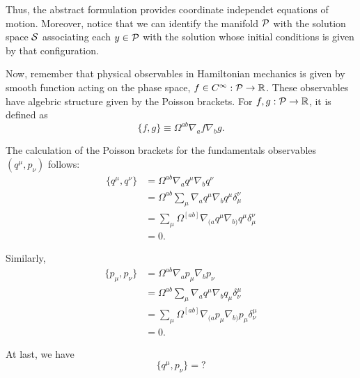 Thus, the abstract formulation provides coordinate independet equations of motion. Moreover, notice that we can identify the manifold \({\mathcal{P}}\) with the solution space \({\mathcal{S}}\) associating each \(y\in{\mathcal{P}}\) with the solution whose initial conditions is given by that configuration.

Now, remember that physical observables in Hamiltonian mechanics is given by smooth function acting on the phase space, \(f\in C^{\infty}:{\mathcal{P}}\to{\mathbb{R}}\). These observables have algebric structure given by the Poisson brackets. For \(f,g:{\mathcal{P}}\to{\mathbb{R}}\), it is defined as
\begin{equation}
    \{f,g\}\equiv\Omega^{ab}\nabla_af\nabla_bg.
\end{equation}

The calculation of the Poisson brackets for the fundamentals observables \((q^{\mu},p_{\nu})\) follows:
\begin{subequations}\label{eq:poisson1}
    \begin{align}
        \{q^{\mu},q^{\nu}\}&=\Omega^{ab}\nabla_aq^{\mu}\nabla_bq^{\nu}\\
        &=\Omega^{ab}\sum_\mu\nabla_aq^{\mu}\nabla_bq^{\mu}\delta^\nu_\mu\\
        &=\sum_{\mu}\Omega^{[ab]}\nabla_{(a}q^{\mu}\nabla_{b)}q^{\mu}\delta^{\nu}_\mu\\
        &=0.
    \end{align}
\end{subequations}

Similarly, 
\begin{subequations}\label{eq:poisson2}
    \begin{align}
        \{p_{\mu},p_{\nu}\}&=\Omega^{ab}\nabla_ap_{\mu}\nabla_bp_{\nu}\\
        &=\Omega^{ab}\sum_\mu\nabla_aq^{\mu}\nabla_bq_{\mu}\delta_\nu^\mu\\
        &=\sum_{\mu}\Omega^{[ab]}\nabla_{(a}p_{\mu}\nabla_{b)}p_{\mu}\delta^{\mu}_\nu\\
        &=0.
    \end{align}
\end{subequations}

At last, we have
\begin{equation}\label{eq:poisson3}
    \{q^{\mu},p_{\nu}\}=?
\end{equation}

